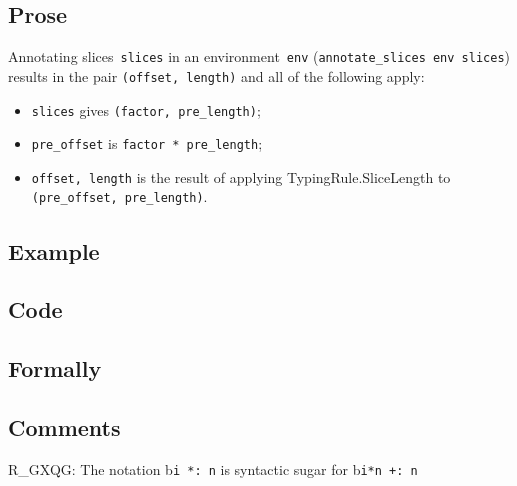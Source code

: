 \documentclass{book}
\begin{document}
  \subsection{Prose}
      Annotating slices~\texttt{slices} in an environment~\texttt{env}
(\texttt{annotate\_slices env slices}) results in the pair \texttt{(offset,
length)} and all of the following apply:
   \begin{itemize}
   \item \texttt{slices} gives \texttt{(factor, pre\_length)};
   \item \texttt{pre\_offset} is \texttt{factor * pre\_length};
   \item \texttt{offset, length} is the result of applying TypingRule.SliceLength to \texttt{(pre\_offset, pre\_length)}.
   \end{itemize}

  \subsection{Example}

  \subsection{Code}

\begin{emptyformal}
    \subsection{Formally}
\end{emptyformal}

\subsection{Comments}
    R\_GXQG: The notation b\texttt{i *: n} is syntactic sugar for b\texttt{i*n +: n}
\end{document}
